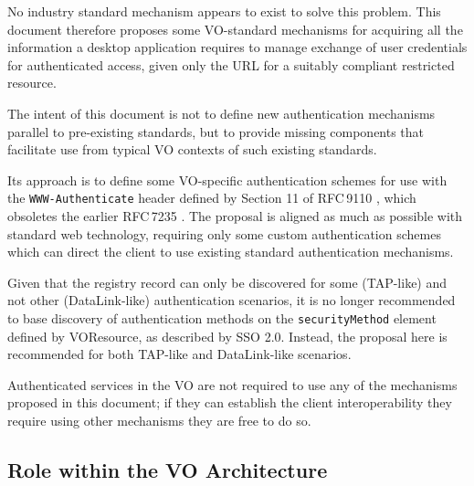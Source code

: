 \documentclass[11pt,a4paper]{ivoa}
\newcommand{\rfc}[1]{RFC\,#1}
\newcommand{\header}[1]{{\tt #1}}
\begin{document}
No industry standard mechanism appears to exist to solve this problem.
This document therefore proposes some VO-standard mechanisms for
acquiring all the information a desktop application requires
to manage exchange of user credentials for authenticated access,
given only the URL for a suitably compliant restricted resource.

The intent of this document is not to define new authentication
mechanisms parallel to pre-existing standards, but to provide
missing components that facilitate use from typical VO contexts
of such existing standards.

Its approach is to define some VO-specific authentication schemes
for use with the \header{WWW-Authenticate} header defined by
Section 11 of \rfc{9110} \citep{std:RFC9110},
which obsoletes the earlier \rfc{7235} \citep{std:RFC7235}.
The proposal is aligned as much as possible with standard web
technology, requiring only some custom authentication schemes
which can direct the client to use existing standard authentication
mechanisms.

Given that the registry record can only be discovered for some
(TAP-like) and not other (DataLink-like) authentication scenarios,
it is no longer recommended to base discovery of authentication methods
on the {\tt securityMethod} element
defined by VOResource, as described by SSO 2.0.
Instead, the proposal here is recommended for both TAP-like and DataLink-like
scenarios.

Authenticated services in the VO are not required to use any of the  
mechanisms proposed in this document; if they can establish the
client interoperability they require using other mechanisms
they are free to do so.

\subsection{Role within the VO Architecture}
\end{document}
